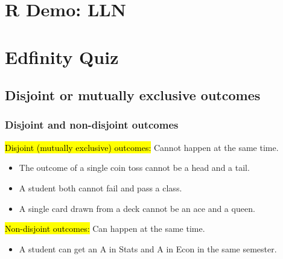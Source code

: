 \documentclass[slidestop,compress,mathserif]{beamer}
\begin{document}

\section{R Demo: LLN}


\section{Edfinity Quiz}


\subsection{Disjoint or mutually exclusive outcomes}


\begin{frame}
\frametitle{Disjoint and non-disjoint outcomes}

\hl{Disjoint (mutually exclusive) outcomes:} Cannot happen at the same time.
\begin{itemize}
\item The outcome of a single coin toss cannot be a head and a tail.
\item A student both cannot fail and pass a class.
\item A single card drawn from a deck cannot be an ace and a queen.
\end{itemize}

\pause

\hl{Non-disjoint outcomes:} Can happen at the same time.
\begin{itemize}
\item A student can get an A in Stats and A in Econ in the same semester.
\end{itemize}

\end{frame}

\end{document}
